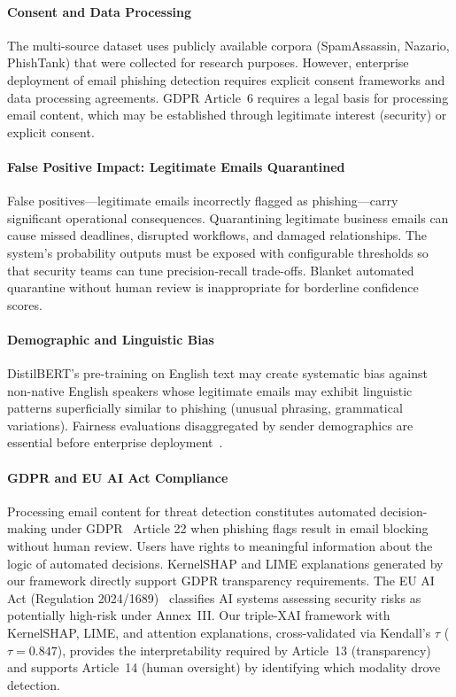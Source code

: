 \documentclass[conference]{IEEEtran}
\begin{document}
\paragraph{Consent and Data Processing}
The multi-source dataset uses publicly available corpora (SpamAssassin,
Nazario, PhishTank) that were collected for research purposes. However,
enterprise deployment of email phishing detection requires explicit
consent frameworks and data processing agreements. GDPR Article~6
requires a legal basis for processing email content, which may be
established through legitimate interest (security) or explicit consent.

\paragraph{False Positive Impact: Legitimate Emails Quarantined}
False positives---legitimate emails incorrectly flagged as phishing---carry
significant operational consequences. Quarantining legitimate business
emails can cause missed deadlines, disrupted workflows, and damaged
relationships. The system's probability outputs must be exposed with
configurable thresholds so that security teams can tune precision-recall
trade-offs. Blanket automated quarantine without human review is
inappropriate for borderline confidence scores.

\paragraph{Demographic and Linguistic Bias}
DistilBERT's pre-training on English text may create systematic bias
against non-native English speakers whose legitimate emails may exhibit
linguistic patterns superficially similar to phishing (unusual phrasing,
grammatical variations). Fairness evaluations disaggregated by sender
demographics are essential before enterprise deployment~\cite{mehrabi2021}.

\paragraph{GDPR and EU AI Act Compliance}
Processing email content for threat detection constitutes automated
decision-making under GDPR~\cite{voigt2017} Article 22 when phishing flags result in
email blocking without human review. Users have rights to meaningful
information about the logic of automated decisions. KernelSHAP and LIME
explanations generated by our framework directly support GDPR
transparency requirements. The EU AI Act (Regulation 2024/1689)~\cite{euaiact2024}
classifies AI systems assessing security risks as potentially high-risk
under Annex~III. Our triple-XAI framework with KernelSHAP, LIME, and
attention explanations, cross-validated via Kendall's $\tau$ ($\tau=0.847$),
provides the interpretability required by Article~13 (transparency) and
supports Article~14 (human oversight) by identifying which modality
drove detection.
\end{document}
